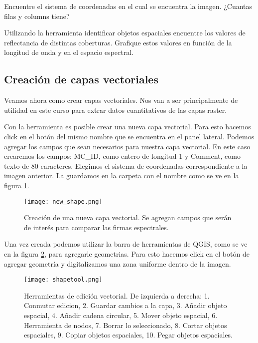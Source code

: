 \begin{act}
    Encuentre el sistema de coordenadas en el cual se encuentra la imagen.
    ¿Cuantas filas y columns tiene?
\end{act}

\begin{act}
   Utilizando la herramienta identificar objetos espaciales encuentre los
   valores de reflectancia de distintas coberturas. Grafique estos  valores en
   funci\'on de la longitud de onda y en el espacio espectral.
\end{act}

\subsection{Creaci\'on de capas vectoriales}

Veamos ahora como crear capas vectoriales. Nos van a ser principalmente
de utilidad en este curso para extrar datos cuantitativos de las capas raster.

Con la herramienta  es posible crear una nueva
capa vectorial. Para esto hacemos click en el bot\'on del mismo nombre que se
encuentra en el panel lateral. Podemos agregar los campos que sean necesarios
para nuestra capa vectorial. En este caso crearemos los campos: MC\_ID, como
entero de longitud 1 y Comment, como texto de 80 caracteres. Elegimos el sistema
de coordenadas correspondiente a la imagen anterior. La guardamos en la carpeta
 con el nombre  como se ve en la figura
\ref{fig:newshape}.

\begin{figure}[h!]
\begin{center}
    \texttt{[image: new\_shape.png]}
\end{center}
\caption{Creaci\'on de una nueva capa vectorial. Se agregan campos que ser\'an de
    inter\'es para comparar las firmas espectrales. }
\label{fig:newshape}
\end{figure}


Una vez creada podemos utilizar la barra de herramientas de QGIS, como se ve en
la figura \ref{fig:shapetool}, para agregarle geometrias. Para esto hacemos click en el bot\'on
de agregar geometr\'ia y digitalizamos una zona uniforme dentro de la imagen.
\begin{figure}[h!]
\begin{center}
    \texttt{[image: shapetool.png]}
\end{center}
\caption{Herramientas de edición vectorial. De izquierda a derecha: 1. Conmutar
    edicion, 2. Guardar cambios a la capa, 3. Añadir objeto espacial, 4. Añadir
    cadena circular, 5. Mover objeto espacial, 6. Herramienta de nodos, 7.
    Borrar lo seleccionado, 8. Cortar objetos espaciales, 9. Copiar objetos
    espaciales, 10. Pegar objetos espaciales.}
\label{fig:shapetool}
\end{figure}

